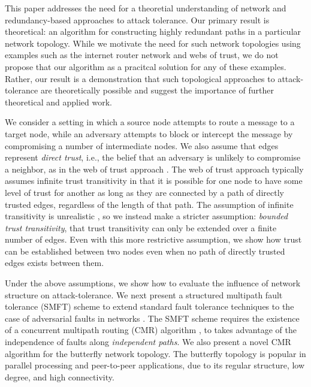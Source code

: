 \documentclass[10pt,letterpaper]{article}
\begin{document}
This paper addresses the need for a theoretial understanding of network and
redundancy-based approaches to attack tolerance.
Our primary result is theoretical: an algorithm for constructing highly redundant
paths in a particular network topology.
While we motivate the need for such network topologies using examples such as
the internet router network and webs of trust,
we do not propose that our algorithm as a pracitcal solution for any of these
examples.
Rather, our result is a demonstration that such topological approaches to
attack-tolerance are theoretically possible and suggest the importance
of further theoretical and applied work.

We consider a setting in which a source node attempts to route a message
to a target node, while an adversary attempts to block or intercept the message
by compromising a number of intermediate nodes.
We also assume that edges represent {\em direct trust},
i.e., the belief that an adversary is unlikely to compromise a neighbor,
as in the web of trust approach
\cite{zimmermann_official_1995,richters_trust_2011}.
The web of trust approach typically assumes infinite trust transitivity in that
it is possible for one node to have some level of trust for another as long
as they are connected by a path of directly trusted edges,
regardless of the length of that path.
The assumption of infinite transitivity is unrealistic
\cite{christianson_why_1997},
so we instead make a stricter assumption: {\em bounded trust transitivity},
that trust transitivity can only be extended over a finite number of edges.
Even with this more restrictive assumption, we show how trust can be established
between two nodes even when no path of directly trusted edges exists between them.

Under the above assumptions,
we show how to evaluate the influence of network structure
on attack-tolerance.
We next present a structured multipath fault tolerance (SMFT) scheme to extend
standard fault tolerance techniques to the case of adversarial faults in
networks
\cite{avizienis_basic_2004, von_neumann_probabilistic_1956}.
The SMFT scheme requires the existence of a
concurrent multipath routing (CMR) algorithm
\cite{zin_survey_2015, qadir_exploiting_2015, khiani_comparative_2013},
to takes advantage of the independence of faults
along {\em independent paths}.
We also present a novel CMR algorithm for the butterfly network topology.
The butterfly topology is popular in parallel processing
\cite{kshemkalyani_distributed_2008} and
peer-to-peer \cite{lua_survey_2005, korzun_structured_2013}
applications, due to its regular structure, low degree, and high connectivity.
\end{document}
